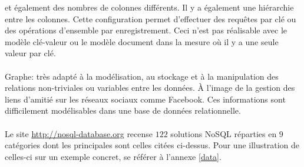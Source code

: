et également des nombres de colonnes différents. Il y a également une
hiérarchie entre les colonnes. Cette configuration permet d’effectuer
des requêtes par clé ou des opérations d'ensemble par enregistrement.
Ceci n'est
pas réalisable avec le modèle \textsf{clé-valeur} ou le
modèle \textsf{document} dans la mesure où il y a une seule valeur par
clé.
\\
\\
{\sf Graphe}: très adapté à la
modélisation, au stockage et à la manipulation des relations
non-triviales ou variables entre les données. À l'image de la gestion
des liens d'amitié sur les réseaux sociaux comme \textsf{Facebook}. 
Ces informations sont difficilement
modélisables dans une base de données relationnelle.
\\
\\ 
Le site \url{http://nosql-database.org} recense $122$
solutions \textsf{NoSQL} réparties en $9$ catégories dont les
principales sont celles citées ci-dessus. Pour une
illustration de celles-ci sur un exemple concret, se référer à l'annexe \ref{data}.

